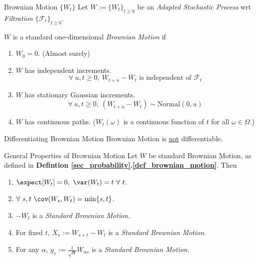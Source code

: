 \documentclass[11pt,a4paper]{article}
\begin{document}
  \begin{definition}{Brownian Motion $\{W_t\}$}\label{def_brownian_motion}
    Let $W:=\{W_t\}_{t\geq0}$ be an \textit{Adapted Stochastic Process} wrt \textit{Filtration} $\{\mathcal{F}_t\}_{t\geq0}$.
    \par $W$ is a standard one-dimensional \textit{Brownian Motion} if
    \begin{enumerate}
      \item $W_0=0$. (Almost surely)
      \item $W$ has independent increments.
      \[ \forall\ u,t\geq0,\ W_{t+u}-W_t\text{ is independent of }\mathcal{F}_t \]
      \item $W$ has stationary Gaussian increments.
      \[ \forall\ u,t\geq0,\ (W_{t+u}-W_t)\sim\text{Normal}(0,u) \]
      \item $W$ has continuous paths. ($W_t(\omega)$ is a continuous function of $t$ for all $\omega\in\Omega$.)
    \end{enumerate}
  \end{definition}

  \begin{remark}{Differentiating Brownian Motion}
    Brownian Motion is \underline{not} differentiable.
  \end{remark}

  \begin{proposition}{General Properties of Brownian Motion}\label{pro_properties_of_standard_brownian_motion}
    Let $W$ be standard Brownian Motion, as defined in \textbf{Defintion \ref{sec_probability}.\ref{def_brownian_motion}}. Then
    \begin{enumerate}
      \item $\expect[W_t]=0,\ \var(W_t)=t\ \forall\ t$.
      \item $\forall\ s,t\ \cov(W_s,W_t)=\min\{s,t\}$.
      \item $-W_t$ is a \textit{Standard Brownian Motion}.
      \item For fixed $t$, $X_s:=W_{s+t}-W_t$ is a \textit{Standard Brownian Motion}.
      \item For any $\alpha$, $y_s:=\frac1{\sqrt\alpha}W_{\alpha s}$ is a \textit{Standard Brownian Motion}.
    \end{enumerate}
  \end{proposition}
\end{document}

